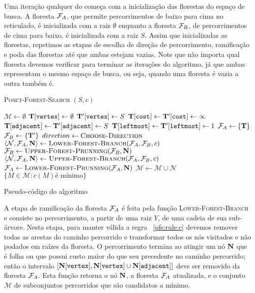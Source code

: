 Uma iteração qualquer do  começa com a inicialização das 
florestas do espaço de busca. A floresta $\mathcal{F}_A$, que permite 
percorrimentos de baixo para cima no reticulado, é inicializada com 
a raiz $\emptyset$ enquanto a floresta $\mathcal{F}_B$, de percorrimentos
de cima para baixo, é inicializada com a raiz $S$. Assim que 
inicializadas as florestas, repetimos as etapas de escolha de direção
de percorrimento, ramificação e poda das florestas até que ambas 
estejam vazias. Note que não importa qual floresta devemos verificar
para terminar as iterações do algoritmo, já que ambas representam o 
mesmo espaço de busca, ou seja, quando uma floresta é vazia a outra 
também é.

\begin{algorithm}[H]
\textsc{Poset-Forest-Search} $(S, c)$
\begin{algorithmic}[1]
    \State $\mathcal{M} \gets \emptyset$
    \State $\mathbf T[\texttt{vertex}] \gets \emptyset$
    \State $\mathbf T'[\texttt{vertex}] \gets S$
    \State $\mathbf T[\texttt{cost}] \gets \mathbf T'[\texttt{cost}] \gets \infty$
    \State $\mathbf T[\texttt{adjacent}] \gets \mathbf T'[\texttt{adjacent}] \gets S$
    \State $\mathbf T[\texttt{leftmost}] \gets \mathbf T'[\texttt{leftmost}] \gets 1$
    \State $\mathcal{F}_A \gets \{\mathbf T\}$
    \State $\mathcal{F}_B \gets \{\mathbf T'\}$
     
        \State $direction \gets {\normalfont\textsc{Choose-Direction}}$
            \State $\langle \mathcal{N}, \mathcal{F}_A, \mathbf N \rangle \gets {\normalfont\textsc{Lower-Forest-Branch}} (\mathcal{F}_A, \mathcal{F}_B, c)$
            \State $\mathcal{F}_B \gets {\normalfont\textsc{Upper-Forest-Prunning}} (\mathcal{F}_B, \mathbf N)$
        \Else
            \State $\langle \mathcal{N}, \mathcal{F}_A, \mathbf N \rangle \gets {\normalfont\textsc{Upper-Forest-Branch}} (\mathcal{F}_A, \mathcal{F}_B, c)$
            \State $\mathcal{F}_A \gets {\normalfont\textsc{Lower-Forest-Prunning}} (\mathcal{F}_A, \mathbf N)$
        \EndIf
        \State $\mathcal{M} \gets \mathcal{M} \cup \mathcal{N}$
    \EndWhile
    \Return $\{M \in \mathcal{M} : c(M) \text{é mínimo}\}$
\end{algorithmic}
\vspace{1em}
\caption{Pseudo-código do algoritmo }
\label{pfs:code:pfs:A}
\end{algorithm}

A etapa de ramificação da floresta $\mathcal{F}_A$ é feita pela função 
\textsc{Lower-Forest-Branch} e consiste no percorrimento, a partir de uma 
raiz $Y$, de uma cadeia de sua sub-árvore. Nesta etapa, para manter 
válida a regra ~\ref{pfs:rule:c} devemos remover todas as arestas do 
caminho percorrido e transformar todos os nós visitados e não podados em 
raízes da floresta. O percorrimento termina ao atingir um nó 
$\mathbf N$ que é folha ou que possui custo maior do que seu 
precedente no caminho percorrido; então o intervalo 
$[\mathbf N[\texttt{vertex}], \mathbf N[\texttt{vertex}] \cup \mathbf N[\texttt{adjacent}]]$
deve ser removido da floresta $\mathcal{F}_A$. Esta função retorna o nó 
$\mathbf N$, a floresta $\mathcal{F}_A$ atualizada, e o conjunto 
$\mathcal{M}$ de subconjuntos percorridos que são candidatos a mínimo.

